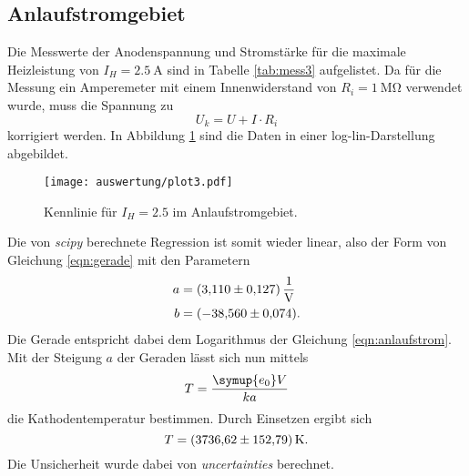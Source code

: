 \subsection{Anlaufstromgebiet}
\label{sec:anlauf}
Die Messwerte der Anodenspannung und Stromstärke für die maximale Heizleistung von $I_H=\SI{2.5}{\ampere}$ sind in Tabelle \ref{tab:mess3}
aufgelistet. Da für die Messung ein Amperemeter mit einem Innenwiderstand von $R_i=\SI{1}{\mega\ohm}$ verwendet wurde, muss die Spannung
zu
\begin{equation*}
    U_k=U+I\cdot R_i
\end{equation*}
korrigiert werden. In Abbildung \ref{fig:plot3} sind die Daten in einer log-lin-Darstellung abgebildet.
\begin{figure}[H]
    \centering
    \texttt{[image: auswertung/plot3.pdf]}
    \caption{Kennlinie für $I_H=2.5$ im Anlaufstromgebiet.}
    \label{fig:plot3}
\end{figure}
\noindent
Die von \textit{scipy} \cite{scipy} berechnete Regression ist somit wieder linear, also der Form von Gleichung \eqref{eqn:gerade} mit den Parametern
\begin{align*}
    a &= \SI{  3.11 \pm 0.127}{\per\volt}\\
    b &= \SI{-38.56 \pm 0.074}{}    .
\end{align*}
Die Gerade entspricht dabei dem Logarithmus der Gleichung \eqref{eqn:anlaufstrom}.
Mit der Steigung $a$ der Geraden lässt sich nun mittels
\begin{equation*}
    T=\frac{\symup{e_0}V}{ka}
\end{equation*}
die Kathodentemperatur bestimmen. Durch Einsetzen ergibt sich
\begin{equation*}
    T=\SI{3736.62 \pm 152.79}{\kelvin}  .
\end{equation*}
Die Unsicherheit wurde dabei von \textit{uncertainties} \cite{uncertainties} berechnet.

